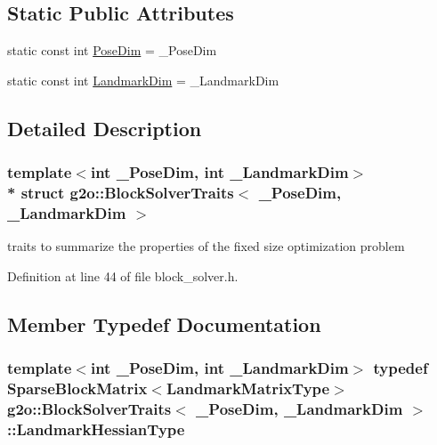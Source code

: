 \subsection*{Static Public Attributes}
\begin{DoxyCompactItemize}
\item 
static const int \hyperlink{structg2o_1_1BlockSolverTraits_a90a03bcfc60b629da5601f6df9514297}{Pose\+Dim} = \+\_\+\+Pose\+Dim
\item 
static const int \hyperlink{structg2o_1_1BlockSolverTraits_a7e6e33971e5243e020a9f41cd3182218}{Landmark\+Dim} = \+\_\+\+Landmark\+Dim
\end{DoxyCompactItemize}


\subsection{Detailed Description}
\subsubsection*{template$<$int \+\_\+\+Pose\+Dim, int \+\_\+\+Landmark\+Dim$>$\\*
struct g2o\+::\+Block\+Solver\+Traits$<$ \+\_\+\+Pose\+Dim, \+\_\+\+Landmark\+Dim $>$}

traits to summarize the properties of the fixed size optimization problem 

Definition at line 44 of file block\+\_\+solver.\+h.



\subsection{Member Typedef Documentation}
\subsubsection[{\texorpdfstring{Landmark\+Hessian\+Type}{LandmarkHessianType}}]{\setlength{\rightskip}{0pt plus 5cm}template$<$int \+\_\+\+Pose\+Dim, int \+\_\+\+Landmark\+Dim$>$ typedef {\bf Sparse\+Block\+Matrix}$<${\bf Landmark\+Matrix\+Type}$>$ {\bf g2o\+::\+Block\+Solver\+Traits}$<$ \+\_\+\+Pose\+Dim, \+\_\+\+Landmark\+Dim $>$\+::{\bf Landmark\+Hessian\+Type}}\hypertarget{structg2o_1_1BlockSolverTraits_ae761bb32d5267e4d74e5d9c2c7e7ad2f}{}\label{structg2o_1_1BlockSolverTraits_ae761bb32d5267e4d74e5d9c2c7e7ad2f}


